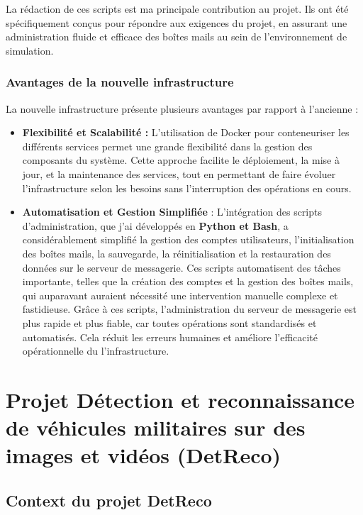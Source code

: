 La rédaction de ces scripts est ma principale contribution au projet.
Ils ont été spécifiquement conçus pour répondre aux exigences du projet, en assurant une administration fluide et efficace des boîtes mails au sein de l'environnement de simulation.


\subsubsection{Avantages de la nouvelle infrastructure}

La nouvelle infrastructure présente plusieurs avantages par rapport à l'ancienne :

\begin{itemize}
	\item \textbf{Flexibilité et Scalabilité :} L'utilisation de Docker pour conteneuriser les différents services permet une grande flexibilité dans la gestion des composants du système.
	      Cette approche facilite le déploiement, la mise à jour, et la maintenance des services, tout en permettant de faire évoluer l'infrastructure selon les besoins sans l'interruption des opérations en cours.
	\item \textbf{Automatisation et Gestion Simplifiée} : L'intégration des scripts d'administration, que j'ai développés en \textbf{Python et Bash}, a considérablement simplifié la gestion des comptes utilisateurs, l'initialisation des boîtes mails, la sauvegarde, la réinitialisation et la restauration des données sur le serveur de messagerie.
	      Ces scripts automatisent des tâches importante, telles que la création des comptes et la gestion des boîtes mails, qui auparavant auraient nécessité une intervention manuelle complexe et fastidieuse.
	      Grâce à ces scripts, l'administration du serveur de messagerie est plus rapide et plus fiable, car toutes opérations sont standardisés et automatisés.
	      Cela réduit les erreurs humaines et améliore l'efficacité opérationnelle du l'infrastructure.
\end{itemize}




\section{Projet Détection et reconnaissance de véhicules militaires sur des images et vidéos (DetReco)}

\subsection{Context du projet DetReco}

